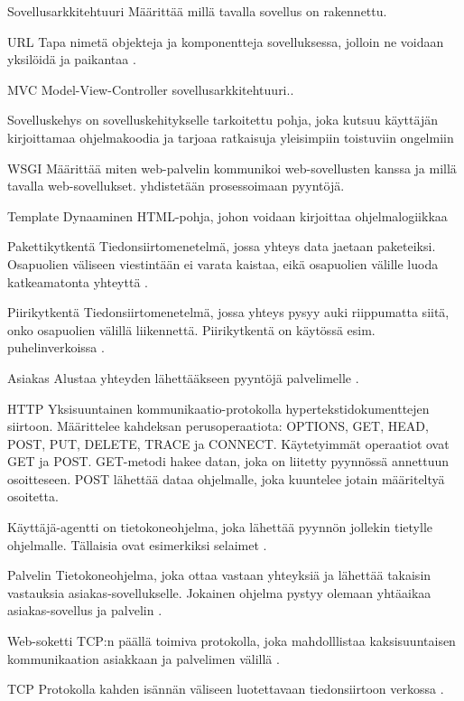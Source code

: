 \documentclass[utf8]{gradu3}
\begin{document}
\begin{thetermlist}
\item[Sovellusarkkitehtuuri] Määrittää millä tavalla sovellus on rakennettu.
\item[URL] Tapa nimetä objekteja ja komponentteja sovelluksessa, jolloin ne voidaan yksilöidä ja paikantaa \parencite{trends}.
\item[MVC] Model-View-Controller sovellusarkkitehtuuri..
\item[Sovelluskehys] on sovelluskehitykselle tarkoitettu pohja, joka kutsuu käyttäjän kirjoittamaa ohjelmakoodia ja tarjoaa ratkaisuja yleisimpiin toistuviin ongelmiin
\item[WSGI] Määrittää miten web-palvelin kommunikoi web-sovellusten kanssa ja millä tavalla web-sovellukset.
yhdistetään prosessoimaan pyyntöjä.
\item[Template] Dynaaminen HTML-pohja, johon voidaan kirjoittaa ohjelmalogiikkaa
\item[Pakettikytkentä] Tiedonsiirtomenetelmä, jossa yhteys data jaetaan paketeiksi. Osapuolien väliseen viestintään ei varata kaistaa, eikä osapuolien välille luoda katkeamatonta yhteyttä \parencite{kytkenta}.
\item[Piirikytkentä] Tiedonsiirtomenetelmä, jossa yhteys pysyy auki riippumatta siitä, onko osapuolien välillä liikennettä. Piirikytkentä on käytössä esim. puhelinverkoissa \parencite{kytkenta}.
\item[Asiakas] Alustaa yhteyden lähettääkseen pyyntöjä palvelimelle \parencite{http}.
\item[HTTP] Yksisuuntainen kommunikaatio-protokolla hypertekstidokumenttejen siirtoon. Määrittelee kahdeksan perusoperaatiota: OPTIONS, GET, HEAD, POST, PUT, DELETE, TRACE ja CONNECT. Käytetyimmät operaatiot ovat GET ja POST. GET-metodi hakee datan, joka on liitetty pyynnössä annettuun osoitteseen. POST lähettää dataa ohjelmalle, joka kuuntelee jotain määriteltyä osoitetta.
\item[Käyttäjä-agentti] on tietokoneohjelma, joka lähettää pyynnön jollekin tietylle ohjelmalle. Tällaisia ovat esimerkiksi selaimet \parencite{http}. 
\item[Palvelin] Tietokoneohjelma, joka ottaa vastaan yhteyksiä ja lähettää takaisin vastauksia asiakas-sovellukselle. Jokainen ohjelma pystyy olemaan yhtäaikaa asiakas-sovellus ja palvelin \parencite{http}. 
\item[Web-soketti] TCP:n päällä toimiva protokolla, joka mahdolllistaa kaksisuuntaisen kommunikaation asiakkaan ja palvelimen välillä \parencite{websocket}.
\item[TCP] Protokolla kahden isännän väliseen luotettavaan tiedonsiirtoon verkossa  \parencite{tcp1_1}.
\end{thetermlist}
\end{document}
